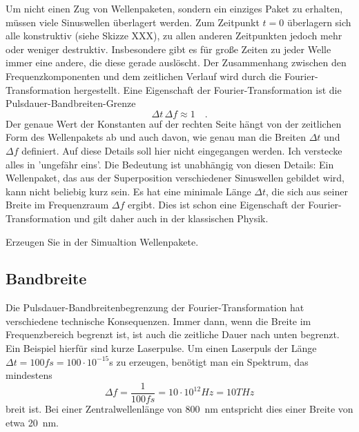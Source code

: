 Um nicht einen Zug von Wellenpaketen, sondern ein einziges Paket zu erhalten, müssen viele Sinuswellen überlagert werden. Zum Zeitpunkt $t=0$ überlagern sich alle konstruktiv (siehe Skizze XXX), zu allen anderen Zeitpunkten jedoch mehr oder weniger destruktiv. Insbesondere gibt es für große Zeiten zu jeder Welle immer eine andere, die diese gerade auslöscht. Der Zusammenhang zwischen den Frequenzkomponenten und dem zeitlichen Verlauf wird durch die Fourier-Transformation hergestellt. Eine Eigenschaft der Fourier-Transformation ist die Pulsdauer-Bandbreiten-Grenze
\begin{equation}
    \Delta t \, \Delta f \approx 1 \quad .
\end{equation}
Der genaue Wert der Konstanten auf der rechten Seite hängt von der zeitlichen Form des Wellenpakets ab und auch davon, wie genau man die Breiten $\Delta t$ und $\Delta f$ definiert. Auf diese Details soll hier nicht eingegangen werden. Ich verstecke alles in 'ungefähr eins'. Die Bedeutung ist unabhängig von diesen Details: Ein Wellenpaket, das aus der Superposition verschiedener Sinuswellen gebildet wird, kann nicht beliebig kurz sein. Es hat eine minimale Länge $\Delta t$, die sich aus seiner Breite im Frequenzraum $\Delta f$ ergibt. Dies ist schon eine Eigenschaft der Fourier-Transformation und gilt daher auch in der klassischen Physik.


\begin{questions}
    \item Erzeugen Sie in der Simualtion Wellenpakete.
\end{questions}

\subsection{Bandbreite}

Die Pulsdauer-Bandbreitenbegrenzung der Fourier-Transformation hat verschiedene technische Konsequenzen. Immer dann, wenn die Breite im Frequenzbereich begrenzt ist, ist auch die zeitliche Dauer nach unten begrenzt. Ein Beispiel hierfür sind kurze Laserpulse. Um einen Laserpuls der Länge $\Delta t = 100 fs = 100 \cdot 10^{-15}$s zu erzeugen, benötigt man ein Spektrum, das mindestens 
\begin{equation}
    \Delta f = \frac{1}{100 fs} = 10 \cdot 10^{12} Hz = 10 THz
\end{equation}
breit ist. Bei einer Zentralwellenlänge von 800~nm entspricht dies einer Breite von etwa 20~nm.



